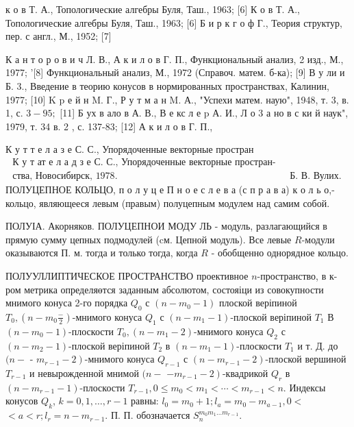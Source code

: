 \documentclass[10pt]{article}
\begin{document}
к о в Т. А., Топологические алгебры Буля, Таш., 1963; [6] К о в Т. А., Топологические алгебры Буля, Таш., 1963; [6] Б и р к г о ф Г., Теория структур, пер. с англ., М., 1952; [7]

К а н т о р о в и ч Л. В., А к и л о в Г. П., Функциональный анализ, 2 изд., М., 1977; '[8] Функциональный анализ, М., 1972 (Справоч. матем. б-ка); [9] В у ли и Б. 3., Введение в теорию конусов в нормированных пространствах, Калинин, 1977; [10] K p е й н M. Г., Р у т м а н M. А., "Успехи матем. наую", 1948, т. 3, в. 1, с. $3-95 ;$ [11] Б ух в ало в А. В., В е кс л е p А. И., Л о 3 а но в с ки й наук", 1979, т. 34 в. 2 , с. 137-83; [12] А к и л о в Г. П.,

К у т т е л а з е С. С., Упорядоченные векторные простран$\begin{array}{ll}\text { К у т ат е л а д з е С. С., Упорядоченные векторные простран- } \\ \text { ства, Новосибирск, } 1978 . & \text { Б. В. Вулих. }\end{array}$ ПОЛУЦЕПНОЕ КОЛЬЦО, п о л у ц е П н о е с л е в а (с п р а в а) к о л ь о,- кольцо, являющееся левым (правым) полуцепным модулем над самим собой.



ПОЛУІА. Акорняков. ПОЛУЦЕПНОИ МОДУ ЛЬ - модуль, разлагающийся в прямую сумму цепных подмодулей (cм. Цепной модуль). Все левые $R$-модули оказываются П. м. тогда и только тогда, когда $R$ - обобщенно однорядное кольцо.



ПОЛУУЛЛИПТИЧЕСКОЕ ПРОСТРАНСТВО проективное $n$-пространство, в к-ром метрика определяөтся заданным абсолютом, состояіци из совокупности мнимого конуса 2-го порядка $Q_{0}$ с $\left(n-m_{0}-1\right)$ плоской веріпиной $T_{0},\left(n-m_{0} \frac{-}{2}\right)$-мнимого конуса $Q_{1}$ с $\left(n-m_{1}-1\right)$-плоской веріпиной $T_{1}$ В $\left(n-m_{0}-1\right)$-плоскости $T_{0},\left(n-m_{1}-2\right)$-мнимого конуса $Q_{2}$ с $\left(n-m_{2}-1\right)$-плоской веріпиной $T_{2}$ в $\left(n-m_{1}-1\right)$-плоскости $T_{1}$ и т. Д. до $(n-$ - $\left.m_{r-1}-2\right)$-мнимого конуса $Q_{r-1}$ с $\left(n-m_{r-1}-2\right)$-плоской вершиной $T_{r-1}$ и невырожденной мнимой $(n-$ $\left.-m_{r-1}-2\right)$-квадрикой $Q_{r}$ в $\left(n-m_{r-1}-1\right)$-плоскости $T_{r-1}, 0 \leqslant m_{0}<m_{1}<\cdots<m_{r-1}<n$. Индексы конусов $Q_{k}$, $k=0,1, \ldots, r-1$ равны: $l_{0}=m_{0}+1 ; l_{a}=m_{0}-m_{a-1}, 0<$ $<a<r ; l_{r}=n-m_{r-1}$. П. П. обозначается $S_{n}^{m_{0} m_{1} \ldots m_{r-1}}$.
\end{document}
